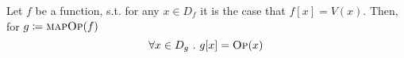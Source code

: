 




\begin{theorem}\label{thm}
Let $f$ be a function, s.t. for any $x \in D_f$ it is the case that $f[x] = V(x)$. Then, for
$g \coloneqq \textsc{mapOp}(f)$
\[
\forall x \in D_g \ .\ g[x] = \textsc{Op}(x)
\]
\end{theorem}

